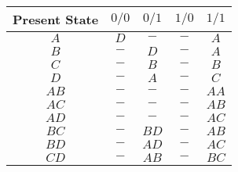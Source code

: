 \documentclass[9pt]{beamer}
\begin{document}
\begin{frame}
\begin{center}
\begin{tabular}{ccccc}
\hline

\hline

\hline

\hline
 
Present State & $0/0$ & $0/1$ & $1/0$ & $1/1$ \\
\hline
$A$  & $D$ & $-$  & $-$ & $A$\\
$B$  & $-$ & $D$  & $-$ & $A$\\
$C$  & $-$ & $B$  & $-$ & $B$\\
$D$  & $-$ & $A$  & $-$ & $C$\\
$AB$ & $-$ & $-$  & $-$ & $AA$\\
$AC$ & $-$ & $-$  & $-$ & $AB$\\
$AD$ & $-$ & $-$  & $-$ & $AC$\\
$BC$ & $-$ & $BD$ & $-$ & $AB$\\
$BD$ & $-$ & $AD$ & $-$ & $AC$\\
$CD$ & $-$ & $AB$ & $-$ & $BC$\\
\hline

\hline

\hline

\hline
\end{tabular}
\end{center}

\vspace*{0.3cm}
\end{frame}
\end{document}
